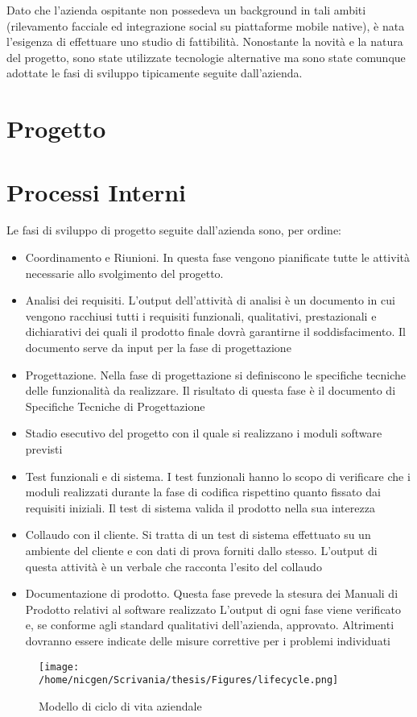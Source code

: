 Dato che l'azienda ospitante non possedeva un background in tali ambiti (rilevamento facciale ed integrazione social su piattaforme mobile native), è nata l'esigenza di effettuare uno studio di fattibilità. Nonostante la novità e la natura del progetto, sono state utilizzate tecnologie alternative ma sono state comunque adottate le fasi di sviluppo tipicamente seguite dall'azienda.

\section{Progetto}

\section{Processi Interni}

Le fasi di sviluppo di progetto seguite dall'azienda sono, per ordine:
\begin{itemize}

\item Coordinamento e Riunioni. In questa fase vengono pianificate tutte le attività necessarie allo
svolgimento del progetto.
\item Analisi dei requisiti. L'output dell'attività di analisi è un documento in cui vengono racchiusi
tutti i requisiti funzionali, qualitativi, prestazionali e dichiarativi dei quali il prodotto finale
dovrà garantirne il soddisfacimento. Il documento serve da input per la fase di progettazione
\item Progettazione. Nella fase di progettazione si definiscono le specifiche tecniche delle funzionalità
da realizzare. Il risultato di questa fase è il documento di Specifiche Tecniche di Progettazione
\item Stadio esecutivo del progetto con il quale si realizzano i moduli software previsti
\item Test funzionali e di sistema. I test funzionali hanno lo scopo di verificare che i moduli realizzati
durante la fase di codifica rispettino quanto fissato dai requisiti iniziali. Il test di sistema valida
il prodotto nella sua interezza
\item Collaudo con il cliente. Si tratta di un test di sistema effettuato su un ambiente del cliente
e con dati di prova forniti dallo stesso. L'output di questa attività è un verbale che racconta
l'esito del collaudo
\item Documentazione di prodotto. Questa fase prevede la stesura dei Manuali di Prodotto relativi
al software realizzato
L'output di ogni fase viene verificato e, se conforme agli standard qualitativi dell'azienda, approvato.
Altrimenti dovranno essere indicate delle misure correttive per i problemi individuati
\end{itemize}
\begin{figure}[h]\centering  
\texttt{[image: /home/nicgen/Scrivania/thesis/Figures/lifecycle.png]}
\caption[Modello di ciclo di vita aziendale]{Modello di ciclo di vita aziendale}
\label{pic-a}
\end{figure}



